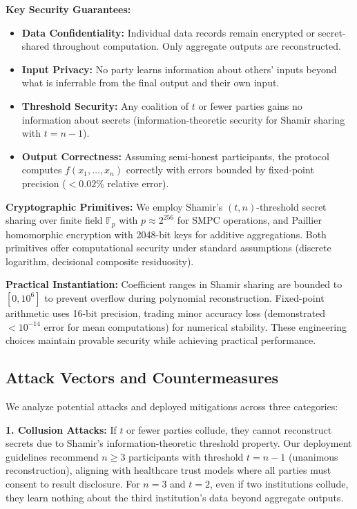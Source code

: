 \documentclass[conference]{IEEEtran}
\begin{document}
\textbf{Key Security Guarantees:}
\begin{itemize}
    \item \textbf{Data Confidentiality:} Individual data records remain encrypted or secret-shared throughout computation. Only aggregate outputs are reconstructed.
    \item \textbf{Input Privacy:} No party learns information about others' inputs beyond what is inferrable from the final output and their own input.
    \item \textbf{Threshold Security:} Any coalition of $t$ or fewer parties gains no information about secrets (information-theoretic security for Shamir sharing with $t = n-1$).
    \item \textbf{Output Correctness:} Assuming semi-honest participants, the protocol computes $f(x_1, \dots, x_n)$ correctly with errors bounded by fixed-point precision ($< 0.02\%$ relative error).
\end{itemize}

\textbf{Cryptographic Primitives:} We employ Shamir's $(t,n)$-threshold secret sharing over finite field $\mathbb{F}_p$ with $p \approx 2^{256}$ for SMPC operations, and Paillier homomorphic encryption with 2048-bit keys for additive aggregations. Both primitives offer computational security under standard assumptions (discrete logarithm, decisional composite residuosity).

\textbf{Practical Instantiation:} Coefficient ranges in Shamir sharing are bounded to $[0, 10^6]$ to prevent overflow during polynomial reconstruction. Fixed-point arithmetic uses 16-bit precision, trading minor accuracy loss (demonstrated $< 10^{-14}$ error for mean computations) for numerical stability. These engineering choices maintain provable security while achieving practical performance.

\subsection{Attack Vectors and Countermeasures}
We analyze potential attacks and deployed mitigations across three categories:

\textbf{1. Collusion Attacks:} If $t$ or fewer parties collude, they cannot reconstruct secrets due to Shamir's information-theoretic threshold property. Our deployment guidelines recommend $n \geq 3$ participants with threshold $t = n-1$ (unanimous reconstruction), aligning with healthcare trust models where all parties must consent to result disclosure. For $n=3$ and $t=2$, even if two institutions collude, they learn nothing about the third institution's data beyond aggregate outputs.
\end{document}
